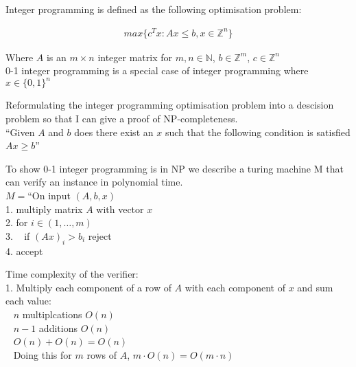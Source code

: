 \documentclass[mathserif,handout]{beamer}
\begin{document}
Integer programming is defined as the following optimisation problem:

\begin{align}
	max \{ c^Tx : Ax \leq b, x \in \mathbb{Z}^n\}
\end{align}

Where $A$ is an $m \times n$ integer matrix for $m,n \in \mathbb{N}$, $b \in
\mathbb{Z}^m$, $c \in \mathbb{Z}^n$\\

0-1 integer programming is a special case of integer programming where $x \in
\{0,1\}^n$

Reformulating the integer programming optimisation problem into a descision
problem so that I can give a proof of NP-completeness.\\

``Given $A$ and $b$ does there exist an $x$ such that the following condition
is satisfied $Ax \geq b$''

To show 0-1 integer programming is in NP we describe a turing machine M that
can verify an instance in polynomial time.\\

$M = $``On input $(A, b, x)$\\
1. multiply matrix $A$ with vector $x$\\
2. for $i \in (1,\ldots,m)$\\
3. ~ if $(Ax)_i > b_i$ reject\\
4. accept


Time complexity of the verifier:\\
1. Multiply each component of a row of $A$ with each component of $x$ and sum
each value:\\
~ $n$ multiplcations $O(n)$\\
~ $n - 1$ additions $O(n)$\\
~ $O(n) + O(n) = O(n)$\\
~ Doing this for $m$ rows of $A$, $m \cdot O(n) = O(m \cdot n )$
\end{document}
